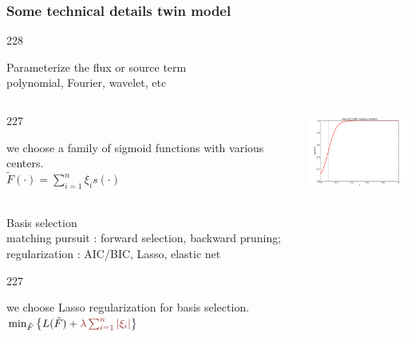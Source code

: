 \documentclass{beamer}
\let\oldcite=\cite
\renewcommand{\cite}[1]{\textcolor[rgb]{.4,.4,.85}{\oldcite{#1}}}
\newcommand{\barrow}{\item[\color{darkred}\ding{228}]}
\newcommand{\carrow}{\item[\color{darkred}\ding{227}]}
\begin{document}
\setcounter{framenumber}{9}

\begin{frame}
    \frametitle{Some technical details \hfill \scriptsize{twin model}}\small
    \begin{dinglist}{228}
        \barrow Parameterize the flux or source term \\\vspace{.05cm} \scriptsize polynomial, Fourier, wavelet, etc\\
        \small
        \vspace{-.3cm}
        \begin{columns}
            \begin{dinglist}{227}
                \carrow we choose a family of sigmoid functions with various centers.\\\scriptsize
                        $
                            \tilde{F}(\cdot) = \sum_{i=1}^n \xi_i s(\cdot)
                        $
            \end{dinglist}
            \small
            \includegraphics[width=3.5cm]{sigmoid_1.png}
        \end{columns}
        \barrow Basis selection\\\vspace{.05cm}
            \scriptsize matching pursuit \cite{Adler 96, Billing07}: forward selection, backward pruning;\\
            regularization \cite{Stone 77, Schwarz 78, Tibshirani 96}: AIC/BIC, Lasso, elastic net
            \small\vspace{.16cm}
            \begin{dinglist}{227}
                \carrow we choose Lasso regularization for basis selection.\scriptsize\\
                $
                    \min_{\tilde{F}} \left\{ L(\tilde{F})+\textcolor{darkred}{\lambda\sum_{i=1}^n\left| \xi_i \right|}\right\}
                $
            \end{dinglist}
    \end{dinglist}
\end{frame}
\end{document}
